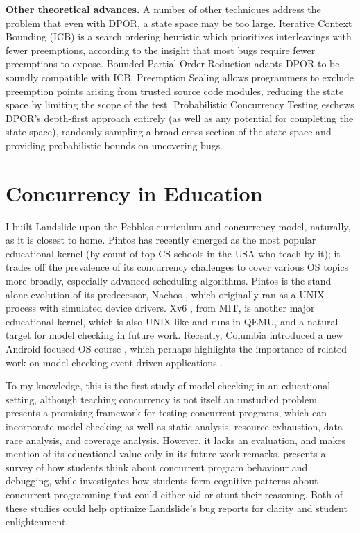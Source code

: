 {\bf Other theoretical advances.}
A number of other techniques address the problem that even with DPOR, a state space may be too large.
Iterative Context Bounding (ICB) \cite{chess-icb} is a search ordering heuristic which prioritizes interleavings with fewer preemptions,
according to the insight that most bugs require fewer preemptions to expose.
Bounded Partial Order Reduction \cite{bpor} adapts DPOR to be soundly compatible with ICB.
Preemption Sealing \cite{sealing} allows programmers to exclude preemption points arising from trusted source code modules,
reducing the state space by limiting the scope of the test.
Probabilistic Concurrency Testing \cite{randomized-scheduler} eschews DPOR's depth-first approach entirely (as well as any potential for completing the state space), randomly sampling a broad cross-section of the state space and providing probabilistic bounds on uncovering bugs.

\section{Concurrency in Education}

I built Landslide upon the Pebbles \cite{kspec} curriculum and concurrency model, naturally, as it is closest to home. %
Pintos \cite{pintos} has recently emerged as the most popular educational kernel
(by count of top CS schools in the USA who teach by it);
it trades off the prevalence of its concurrency challenges to cover various OS topics more broadly,
especially advanced scheduling algorithms.
Pintos is the stand-alone evolution of its predecessor, Nachos \cite{nachos}, which originally ran as a UNIX process with simulated device drivers.
%
Xv6 \cite{xv6}, from MIT, is another major educational kernel, which is also UNIX-like and runs in QEMU,
and a natural target for model checking in future work.
Recently, Columbia introduced a new Android-focused OS course \cite{teaching-android},
which perhaps highlights the importance of related work on model-checking event-driven applications \cite{r4}.

To my knowledge, this is the first study of model checking in an educational setting, although teaching concurrency is not itself an unstudied problem.
\cite{towards-a-framework} presents a promising framework for testing concurrent programs,
which can incorporate model checking as well as static analysis, resource exhaustion, data-race analysis, and coverage analysis.
However, it lacks an evaluation, and makes mention of its educational value only in its future work remarks.
%
\cite{how-studence} presents a survey of how students think about concurrent program behaviour and debugging,
while \cite{learning-concurrency} investigates how students form cognitive patterns about concurrent programming that could either aid or stunt their reasoning.
Both of these studies could help optimize Landslide's bug reports for clarity and student enlightenment.


